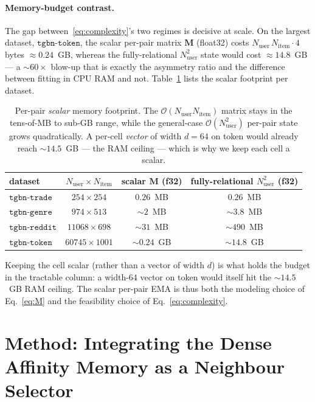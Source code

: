 \documentclass[11pt]{article}
\begin{document}
\paragraph{Memory-budget contrast.}
The gap between~\eqref{eq:complexity}'s two regimes is decisive at scale. On the
largest dataset, $\texttt{tgbn-token}$, the scalar per-pair matrix
$\mathbf{M}$ (float32) costs $N_{\text{user}}\,N_{\text{item}}\cdot 4$ bytes
$\approx 0.24$~GB, whereas the fully-relational $N_{\text{user}}^{2}$ state would
cost $\approx 14.8$~GB --- a $\sim\!60\times$ blow-up that is exactly the
asymmetry ratio and the difference between fitting in CPU RAM and not.
Table~\ref{tab:mem-budget} lists the scalar footprint per dataset.
\begin{table}[t]
\centering
\begin{tabular}{lccc}
\hline
dataset & $N_{\text{user}}\!\times\!N_{\text{item}}$ & scalar $\mathbf{M}$ (f32) & fully-relational $N_{\text{user}}^{2}$ (f32) \\
\hline
$\texttt{tgbn-trade}$  & $254\times254$      & $0.26$~MB & $0.26$~MB \\
$\texttt{tgbn-genre}$  & $974\times513$      & $\sim 2$~MB   & $\sim 3.8$~MB \\
$\texttt{tgbn-reddit}$ & $11068\times698$    & $\sim 31$~MB  & $\sim 490$~MB \\
$\texttt{tgbn-token}$  & $60745\times1001$   & $\sim 0.24$~GB & $\sim 14.8$~GB \\
\hline
\end{tabular}
\caption{Per-pair \emph{scalar} memory footprint. The $\mathcal{O}(N_{\text{user}}N_{\text{item}})$
matrix stays in the tens-of-MB to sub-GB range, while the general-case
$\mathcal{O}(N_{\text{user}}^{2})$ per-pair state grows quadratically. A per-cell
\emph{vector} of width $d{=}64$ on token would already reach $\sim\!14.5$~GB ---
the RAM ceiling --- which is why we keep each cell a scalar.}
\label{tab:mem-budget}
\end{table}
Keeping the cell scalar (rather than a vector of width $d$) is what holds the
budget in the tractable column: a width-$64$ vector on token would itself hit the
$\sim\!14.5$~GB RAM ceiling. The scalar per-pair EMA is thus both the modeling
choice of Eq.~\eqref{eq:M} and the feasibility choice of Eq.~\eqref{eq:complexity}.

\section{Method: Integrating the Dense Affinity Memory as a Neighbour Selector}
\label{sec:method-integration}
\end{document}

